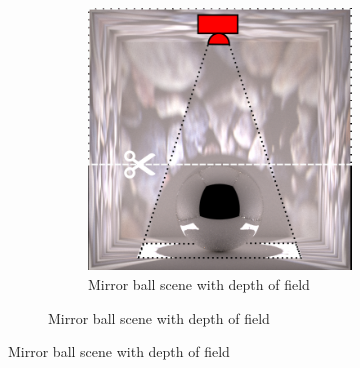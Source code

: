 \begin{figure}[]
    \centering    
    \begin{subfigure}{\textwidth}
        \centering
        \begin{subfigure}{0.5\textwidth}
            \centering
            \includegraphics[width=\textwidth]{images/04-experiment03/ball_dof/scene.jpg}
            \caption*{Mirror ball scene with depth of field}
        \end{subfigure}


\end{subfigure}
\end{figure}
